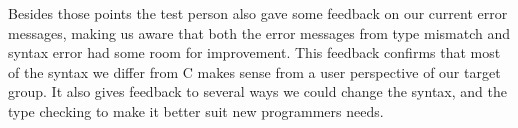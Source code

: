 Besides those points the test person also gave some feedback on our current error messages, making us aware that both the error messages from type mismatch and syntax error had some room for improvement.
This feedback confirms that most of the syntax we differ from C makes sense from a user perspective of our target group. It also gives feedback to several ways we could change the syntax, and the type checking to make it better suit new programmers needs.










